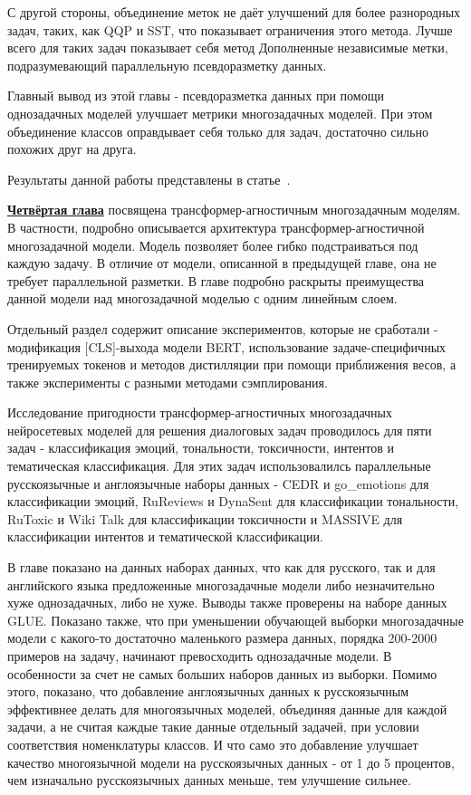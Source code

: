 С другой стороны, объединение меток не даёт улучшений для более разнородных задач, таких, как QQP и SST, что показывает ограничения этого метода. Лучше всего для таких задач показывает себя метод Дополненные независимые метки, подразумевающий параллельную псевдоразметку данных. 

Главный вывод из этой главы - псевдоразметка данных при помощи однозадачных моделей улучшает метрики многозадачных моделей. При этом объединение классов оправдывает себя только для задач, достаточно сильно похожих друг на друга. 

Результаты данной работы представлены в статье~\cite{pseudolabel}.

\underline{\textbf{Четвёртая глава}} посвящена трансформер-агностичным многозадачным моделям. В частности, подробно описывается архитектура трансформер-агностичной многозадачной модели. 
Модель позволяет более гибко подстраиваться под каждую задачу. В отличие от модели, описанной в предыдущей главе, она не требует параллельной разметки. В главе подробно раскрыты преимущества данной модели над многозадачной моделью с одним линейным слоем.

Отдельный раздел содержит описание экспериментов, которые не сработали - модификация [CLS]-выхода модели BERT, использование задаче-специфичных тренируемых токенов и методов дистилляции при помощи приближения весов, а также эксперименты с разными методами сэмплирования. 

Исследование пригодности трансформер-агностичных многозадачных нейросетевых моделей для решения диалоговых задач проводилось для пяти задач - классификация эмоций, тональности, токсичности, интентов и тематическая классификация. Для этих задач использовалилсь параллельные русскоязычные и англоязычные наборы данных - CEDR и go\_emotions для классификации эмоций, RuReviews и DynaSent для классификации тональности, RuToxic и Wiki Talk для классификации токсичности и MASSIVE для классификации интентов и тематической классификации.

В главе показано на данных наборах данных, что как для русского, так и для английского языка предложенные многозадачные модели либо незначительно хуже однозадачных, либо не хуже. Выводы также проверены на наборе данных GLUE. Показано также, что при уменьшении обучающей выборки многозадачные модели с какого-то достаточно маленького размера данных, порядка 200-2000 примеров на задачу, начинают превосходить однозадачные модели. В особенности за счет не самых больших наборов данных из выборки. Помимо этого, показано, что добавление англоязычных данных к русскоязычным эффективнее делать для многоязычных моделей, объединяя данные для каждой задачи, а не считая каждые такие данные отдельный задачей, при условии соответствия номенклатуры классов. И что само это добавление улучшает качество многоязычной модели на русскоязычных данных - от 1 до 5 процентов, чем изначально русскоязычных данных меньше, тем улучшение сильнее.

